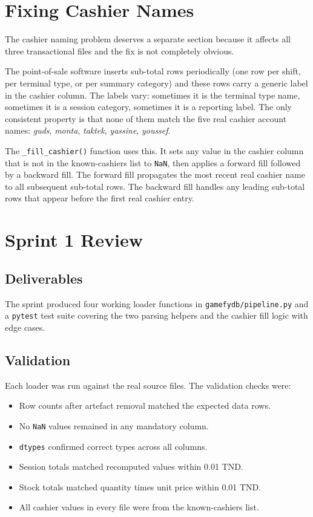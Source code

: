 \documentclass[12pt, a4paper]{report}
\begin{document}
\section{Fixing Cashier Names}

The cashier naming problem deserves a separate section because it affects all three
transactional files and the fix is not completely obvious.

The point-of-sale software inserts sub-total rows periodically (one row per shift,
per terminal type, or per summary category) and these rows carry a generic label
in the cashier column. The labels vary: sometimes it is the terminal type name,
sometimes it is a session category, sometimes it is a reporting label. The only
consistent property is that none of them match the five real cashier account names:
\textit{guds}, \textit{monta}, \textit{taktek}, \textit{yassine}, \textit{youssef}.

The \texttt{\_fill\_cashier()} function uses this. It sets any value in the cashier
column that is not in the known-cashiers list to \texttt{NaN}, then applies a forward
fill followed by a backward fill. The forward fill propagates the most recent real
cashier name to all subsequent sub-total rows. The backward fill handles any leading
sub-total rows that appear before the first real cashier entry.

\section{Sprint 1 Review}

\subsection{Deliverables}

The sprint produced four working loader functions in \texttt{gamefydb/pipeline.py}
and a \texttt{pytest} test suite covering the two parsing helpers and the cashier
fill logic with edge cases.

\subsection{Validation}

Each loader was run against the real source files. The validation checks were:

\begin{itemize}[noitemsep]
  \item Row counts after artefact removal matched the expected data rows.
  \item No \texttt{NaN} values remained in any mandatory column.
  \item \texttt{dtypes} confirmed correct types across all columns.
  \item Session totals matched recomputed values within 0.01 TND.
  \item Stock totals matched quantity times unit price within 0.01 TND.
  \item All cashier values in every file were from the known-cashiers list.
\end{itemize}
\end{document}
